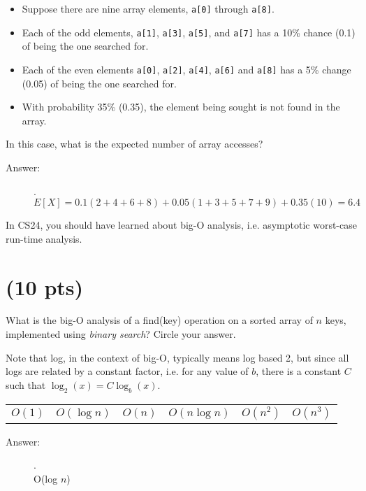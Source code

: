 \documentclass[11pt]{article}
\begin{document}
\begin{itemize}
\item Suppose there are nine array elements, \texttt{a[0]} through \texttt{a[8]}.
\item Each of the odd elements, \texttt{a[1]}, \texttt{a[3]}, \texttt{a[5]}, and \texttt{a[7]} has a 10\% chance (0.1) of being the one searched for.
\item Each of the even elements \texttt{a[0]}, \texttt{a[2]}, \texttt{a[4]}, \texttt{a[6]} and \texttt{a[8]} has a 5\% change (0.05) of being the one searched for.
\item With probability 35\% (0.35), the element being sought is not found in the array.
\end{itemize}

In this case, what is the expected number of array accesses?


\begin{description}
    \item[Answer:] .\\
    $E[X] = 0.1(2+4+6+8) + 0.05(1+3+5+7+9) + 0.35(10) = 6.4$
\end{description}

\newpage

In CS24, you should have learned about big-O analysis, i.e. asymptotic worst-case run-time analysis.

\section{(10 pts)}
\label{sec:org26d30f8}

What is the big-O analysis of a find(key) operation on a sorted array of \(n\) keys, implemented using \emph{binary search}? Circle your answer.

Note that log, in the context of big-O, typically means log based 2, but since all logs are related by a constant factor, i.e. for any value of \(b\), there is a constant \(C\) such that \(\log_2(x) = C\log_b(x)\).


\begin{center}
\begin{tabular}{llllll}
\(O(1)\) & \(O(\log n)\) & \(O(n)\) & \(O(n \log n)\) & \(O(n^2)\) & \(O(n^3)\)\\
\end{tabular}
\end{center}

\begin{description}
    \item[Answer:] .\\
    O(log $n$)
\end{description}
\end{document}
